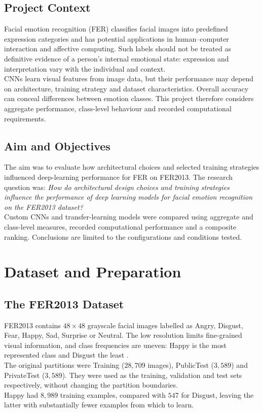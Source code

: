 \documentclass[10pt, a4paper]{article}
\let\oldsection\section
\renewcommand{\section}{%
    \Needspace{4\baselineskip}%
    \oldsection
}
\let\oldsubsection\subsection
\renewcommand{\subsection}{%
    \Needspace{4\baselineskip}%
    \oldsubsection
}
\begin{document}
		\subsection{Project Context}
		
			Facial emotion recognition (FER) classifies facial images into predefined expression categories and has potential applications in human--computer interaction and affective computing. Such labels should not be treated as definitive evidence of a person's internal emotional state: expression and interpretation vary with the individual and context.\\
			CNNs learn visual features from image data, but their performance may depend on architecture, training strategy and dataset characteristics. Overall accuracy can conceal differences between emotion classes. This project therefore considers aggregate performance, class-level behaviour and recorded computational requirements.
		
		\subsection{Aim and Objectives}
		
			The aim was to evaluate how architectural choices and selected training strategies influenced deep-learning performance for FER on FER2013. The research question was: \textit{How do architectural design choices and training strategies influence the performance of deep learning models for facial emotion recognition on the FER2013 dataset?}\\
			Custom CNNs and transfer-learning models were compared using aggregate and class-level measures, recorded computational performance and a composite ranking. Conclusions are limited to the configurations and conditions tested.
	
	
	\section{Dataset and Preparation}
	
		\subsection{The FER2013 Dataset}
			
			FER2013 contains $48\times48$ grayscale facial images labelled as Angry, Disgust, Fear, Happy, Sad, Surprise or Neutral. The low resolution limits fine-grained visual information, and class frequencies are uneven: Happy is the most represented class and Disgust the least \cite{goodfellow2015challenges, fer2013_kaggle}.\\
			The original partitions were Training ($28,709$ images), PublicTest ($3,589$) and PrivateTest ($3,589$). They were used as the training, validation and test sets respectively, without changing the partition boundaries.\\
			Happy had $8,989$ training examples, compared with $547$ for Disgust, leaving the latter with substantially fewer examples from which to learn.
				
\end{document}
